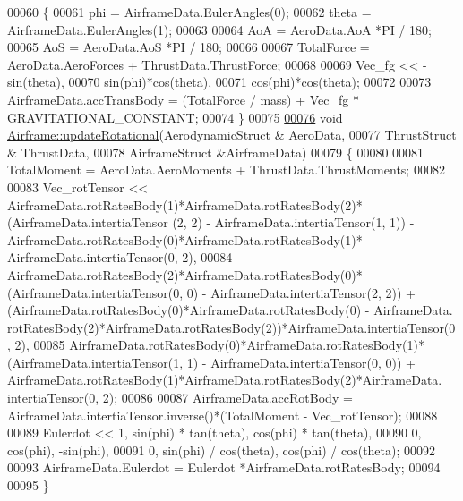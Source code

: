 \begin{DoxyCode}
00060 \{
00061     phi     = AirframeData.EulerAngles(0);
00062     theta   = AirframeData.EulerAngles(1);
00063 
00064     AoA = AeroData.AoA *PI / 180;
00065     AoS = AeroData.AoS *PI / 180;
00066 
00067     TotalForce = AeroData.AeroForces + ThrustData.ThrustForce;
00068 
00069     Vec\_fg << -sin(theta),
00070             sin(phi)*cos(theta),
00071             cos(phi)*cos(theta);
00072 
00073     AirframeData.accTransBody = (TotalForce / mass) + Vec\_fg  * GRAVITATIONAL\_CONSTANT;
00074 \}
00075 
\hyperlink{group___airframe_acf8ce5ef44d07ca8815ca36d13cffcc7}{00076} \textcolor{keywordtype}{void} \hyperlink{group___airframe_acf8ce5ef44d07ca8815ca36d13cffcc7}{Airframe::updateRotational}(AerodynamicStruct & AeroData, 
00077                                 ThrustStruct & ThrustData,
00078                                 AirframeStruct &AirframeData)
00079 \{
00080     
00081     TotalMoment = AeroData.AeroMoments + ThrustData.ThrustMoments;
00082 
00083     Vec\_rotTensor << AirframeData.rotRatesBody(1)*AirframeData.rotRatesBody(2)*(AirframeData.intertiaTensor
      (2, 2) - AirframeData.intertiaTensor(1, 1)) - AirframeData.rotRatesBody(0)*AirframeData.rotRatesBody(1)*
      AirframeData.intertiaTensor(0, 2),
00084         AirframeData.rotRatesBody(2)*AirframeData.rotRatesBody(0)*(AirframeData.intertiaTensor(0, 0) - 
      AirframeData.intertiaTensor(2, 2)) + (AirframeData.rotRatesBody(0)*AirframeData.rotRatesBody(0) - AirframeData.
      rotRatesBody(2)*AirframeData.rotRatesBody(2))*AirframeData.intertiaTensor(0, 2),
00085         AirframeData.rotRatesBody(0)*AirframeData.rotRatesBody(1)*(AirframeData.intertiaTensor(1, 1) - 
      AirframeData.intertiaTensor(0, 0)) + AirframeData.rotRatesBody(1)*AirframeData.rotRatesBody(2)*AirframeData.
      intertiaTensor(0, 2);
00086 
00087     AirframeData.accRotBody = AirframeData.intertiaTensor.inverse()*(TotalMoment - Vec\_rotTensor);
00088 
00089     Eulerdot << 1, sin(phi) * tan(theta), cos(phi) * tan(theta),
00090                 0, cos(phi), -sin(phi),
00091                 0, sin(phi) / cos(theta), cos(phi) / cos(theta);
00092 
00093     AirframeData.Eulerdot = Eulerdot *AirframeData.rotRatesBody;
00094 
00095 \}
\end{DoxyCode}
